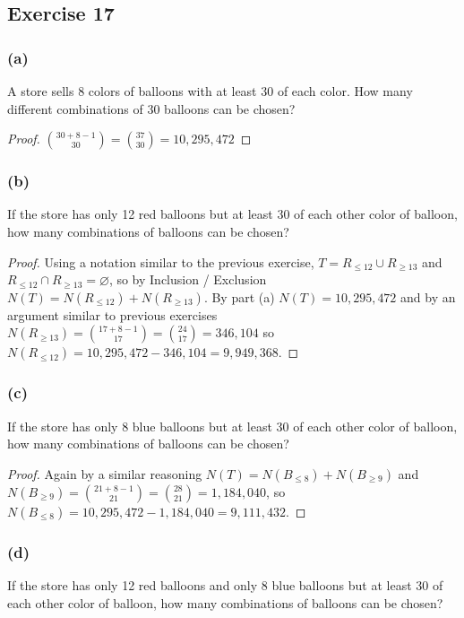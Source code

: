 \documentclass[14pt]{extarticle}
\newcommand{\es}{\varnothing}
\begin{document}
\subsection{Exercise 17}
\subsubsection{(a)}
A store sells 8 colors of balloons with at least 30 of each color. How many different combinations of 30 balloons can be 
chosen?

\begin{proof}
\(\binom{30+8-1}{30} = \binom{37}{30} = 10,295,472\)
\end{proof}

\subsubsection{(b)}
If the store has only 12 red balloons but at least 30 of each other color of balloon, how many combinations of balloons can 
be chosen?

\begin{proof}
Using a notation similar to the previous exercise, \(T = R_{\leq 12} \cup R_{\geq 13}\) and \(R_{\leq 12} \cap 
R_{\geq 13} = \es\), so by Inclusion / Exclusion \(N(T) = N(R_{\leq 12}) + N(R_{\geq 13})\). By part (a) \(N(T) = 
10,295,472\) and by an argument similar to previous exercises \(N(R_{\geq 13}) = \binom{17+8-1}{17} = \binom{24}{17} = 
346,104\) so \(N(R_{\leq 12}) = 10,295,472 - 346,104 = 9,949,368\).
\end{proof}

\subsubsection{(c)}
If the store has only 8 blue balloons but at least 30 of each other color of balloon, how many combinations of balloons can 
be chosen?

\begin{proof}
Again by a similar reasoning \(N(T) = N(B_{\leq 8}) + N(B_{\geq 9})\) and \(N(B_{\geq 9}) = \binom{21 + 8 - 1}{21}
= \binom{28}{21} = 1,184,040\), so \(N(B_{\leq 8}) = 10,295,472 - 1,184,040 = 9,111,432\).
\end{proof}

\subsubsection{(d)}
If the store has only 12 red balloons and only 8 blue balloons but at least 30 of each other color of balloon, how many 
combinations of balloons can be chosen?
\end{document}
